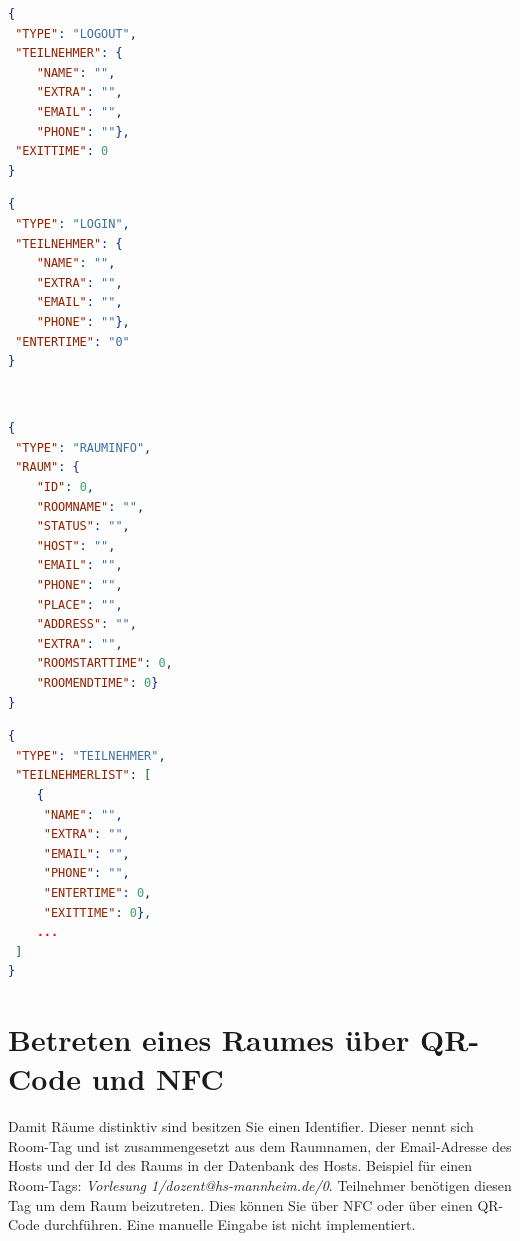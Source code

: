 \begin{minipage}[]{0.45\linewidth}
\begin{lstlisting}[language=json, label={lst:anmeldung}, caption={anmeldung.json}]
{
 "TYPE": "LOGOUT",
 "TEILNEHMER": {
	"NAME": "",
	"EXTRA": "",
	"EMAIL": "",
	"PHONE": ""},
 "EXITTIME": 0
}
\end{lstlisting}
\end{minipage}
\qquad
\begin{minipage}[]{0.45\linewidth}
\begin{lstlisting}[language=json,label={lst:abmeldung}, caption={abmeldung.json}]
{
 "TYPE": "LOGIN",
 "TEILNEHMER": {
	"NAME": "",
	"EXTRA": "",
	"EMAIL": "",
	"PHONE": ""},
 "ENTERTIME": "0"
}
\end{lstlisting}
\end{minipage}
\\
\begin{minipage}[]{0.45\linewidth}
\begin{lstlisting}[language=json, label={lst:rauminfo}, caption={rauminfo.json}]
{
 "TYPE": "RAUMINFO",
 "RAUM": {
	"ID": 0,
	"ROOMNAME": "",
	"STATUS": "",
	"HOST": "",
	"EMAIL": "",
	"PHONE": "",
	"PLACE": "",
	"ADDRESS": "",
	"EXTRA": "",
	"ROOMSTARTTIME": 0,
	"ROOMENDTIME": 0}
}
\end{lstlisting}
\end{minipage}
\qquad
\begin{minipage}[]{0.45\linewidth}
\begin{lstlisting}[language=json, label={lst:teilnehmer}, caption={teilnehmer.json}]
{
 "TYPE": "TEILNEHMER",
 "TEILNEHMERLIST": [
	{
	 "NAME": "",
	 "EXTRA": "",
 	 "EMAIL": "",
 	 "PHONE": "",
 	 "ENTERTIME": 0,
	 "EXITTIME": 0},
	...
 ]
}
\end{lstlisting}
\end{minipage}




\section{Betreten eines Raumes über QR-Code und NFC}
\label{sec:RoomTag - QR und NFC}
Damit Räume distinktiv sind besitzen Sie einen Identifier. Dieser nennt sich Room-Tag und ist zusammengesetzt aus dem Raumnamen, der Email-Adresse des Hosts und der Id des Raums in der Datenbank des Hosts. 
Beispiel für einen Room-Tags: \textit{Vorlesung 1/dozent@hs-mannheim.de/0}.
Teilnehmer benötigen diesen Tag um dem Raum beizutreten. Dies können Sie über NFC oder über einen QR-Code durchführen. Eine manuelle Eingabe ist nicht implementiert.

